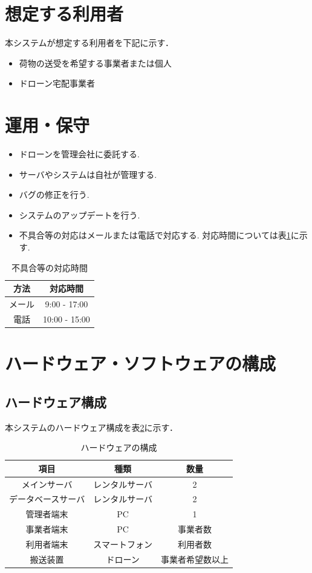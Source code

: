 \documentclass[a4paper, titlepage]{jsarticle}
\begin{document}
\section{想定する利用者}
本システムが想定する利用者を下記に示す．
\begin{itemize}
  \item 荷物の送受を希望する事業者または個人
  \item ドローン宅配事業者
\end{itemize}

\section{運用・保守}
\begin{itemize}
  \item ドローンを管理会社に委託する.
  \item サーバやシステムは自社が管理する.
  \item バグの修正を行う.
  \item システムのアップデートを行う.
  \item 不具合等の対応はメールまたは電話で対応する. 対応時間については表\ref{tb:huguai}に示す.
\end{itemize}

\begin{table}[htbp]
  \centering
  \begin{tabular}{c|c} \hline
    方法  & 対応時間          \\ \hline
    メール & 9:00 - 17:00  \\
    電話  & 10:00 - 15:00 \\ \hline
  \end{tabular}
  \caption{不具合等の対応時間}
  \label{tb:huguai}
\end{table}

\section{ハードウェア・ソフトウェアの構成}
\subsection{ハードウェア構成}
本システムのハードウェア構成を表\ref{fig:hardware}に示す．
\begin{table}[H]
  \begin{center}
    \caption{ハードウェアの構成}
    \label{fig:hardware}
    \begin{tabular}{ccc} \hline
      項目        & 種類      & 数量       \\ \hline \hline
      メインサーバ    & レンタルサーバ & 2        \\
      データベースサーバ & レンタルサーバ & 2        \\
      管理者端末     & PC      & 1        \\
      事業者端末     & PC      & 事業者数     \\
      利用者端末     & スマートフォン & 利用者数     \\
      搬送装置      & ドローン    & 事業者希望数以上 \\ \hline
    \end{tabular}
  \end{center}
\end{table}
\end{document}
